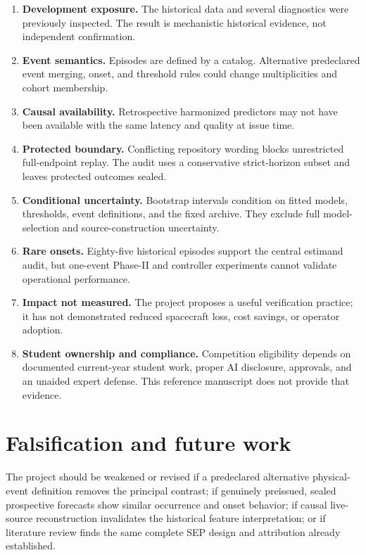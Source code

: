 \documentclass[11pt]{article}
\begin{document}
\begin{enumerate}
\item \textbf{Development exposure.} The historical data and several diagnostics were previously inspected. The result is mechanistic historical evidence, not independent confirmation.
\item \textbf{Event semantics.} Episodes are defined by a catalog. Alternative predeclared event merging, onset, and threshold rules could change multiplicities and cohort membership.
\item \textbf{Causal availability.} Retrospective harmonized predictors may not have been available with the same latency and quality at issue time.
\item \textbf{Protected boundary.} Conflicting repository wording blocks unrestricted full-endpoint replay. The audit uses a conservative strict-horizon subset and leaves protected outcomes sealed.
\item \textbf{Conditional uncertainty.} Bootstrap intervals condition on fitted models, thresholds, event definitions, and the fixed archive. They exclude full model-selection and source-construction uncertainty.
\item \textbf{Rare onsets.} Eighty-five historical episodes support the central estimand audit, but one-event Phase-II and controller experiments cannot validate operational performance.
\item \textbf{Impact not measured.} The project proposes a useful verification practice; it has not demonstrated reduced spacecraft loss, cost savings, or operator adoption.
\item \textbf{Student ownership and compliance.} Competition eligibility depends on documented current-year student work, proper AI disclosure, approvals, and an unaided expert defense. This reference manuscript does not provide that evidence.
\end{enumerate}

\section{Falsification and future work}

The project should be weakened or revised if a predeclared alternative physical-event definition removes the principal contrast; if genuinely preissued, sealed prospective forecasts show similar occurrence and onset behavior; if causal live-source reconstruction invalidates the historical feature interpretation; or if literature review finds the same complete SEP design and attribution already established.
\end{document}
